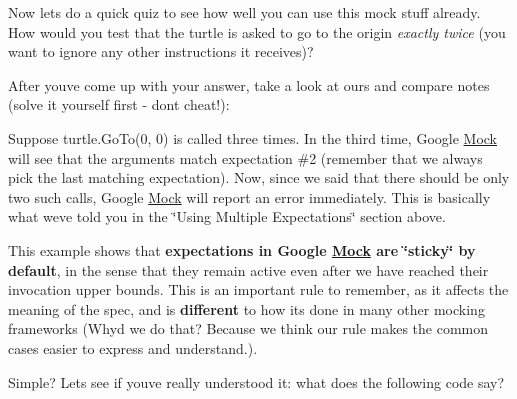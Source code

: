 Now let\textquotesingle{}s do a quick quiz to see how well you can use this mock stuff already. How would you test that the turtle is asked to go to the origin {\itshape exactly twice} (you want to ignore any other instructions it receives)?

After you\textquotesingle{}ve come up with your answer, take a look at ours and compare notes (solve it yourself first -\/ don\textquotesingle{}t cheat!)\+:


\begin{DoxyCode}{0}
\end{DoxyCode}


Suppose {\ttfamily turtle.\+Go\+To(0, 0)} is called three times. In the third time, Google \mbox{\hyperlink{class_mock}{Mock}} will see that the arguments match expectation \#2 (remember that we always pick the last matching expectation). Now, since we said that there should be only two such calls, Google \mbox{\hyperlink{class_mock}{Mock}} will report an error immediately. This is basically what we\textquotesingle{}ve told you in the \char`\"{}\+Using Multiple Expectations\char`\"{} section above.

This example shows that {\bfseries{expectations in Google \mbox{\hyperlink{class_mock}{Mock}} are \char`\"{}sticky\char`\"{} by default}}, in the sense that they remain active even after we have reached their invocation upper bounds. This is an important rule to remember, as it affects the meaning of the spec, and is {\bfseries{different}} to how it\textquotesingle{}s done in many other mocking frameworks (Why\textquotesingle{}d we do that? Because we think our rule makes the common cases easier to express and understand.).

Simple? Let\textquotesingle{}s see if you\textquotesingle{}ve really understood it\+: what does the following code say?


